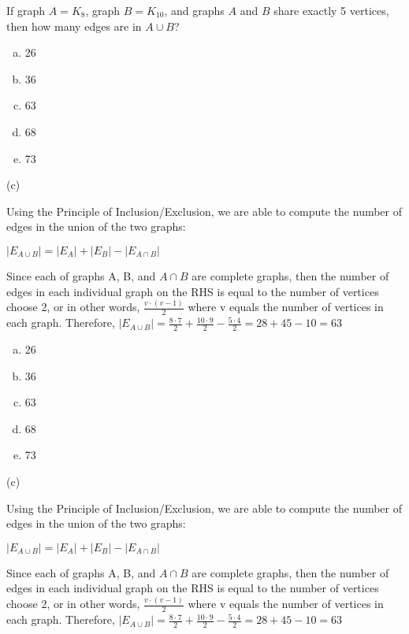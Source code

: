 If graph $A = K_8$, graph $B = K_{10}$, and graphs $A$ and $B$ share exactly 5 vertices, then how many edges are in $A \cup B$?

\begin{enumerate} [(a)]
    \item 26
    \item 36
    \item 63
    \item 68
    \item 73
\end{enumerate}

\begin{solution}
(c)

Using the Principle of Inclusion/Exclusion, we are able to compute the number of edges in the union of the two graphs:

$|E_{A \cup B}| = |E_A| + |E_B| - |E_{A \cap B}|$

Since each of graphs A, B, and $A \cap B$ are complete graphs, then the number of edges in each individual graph on the RHS is equal to the number of vertices choose 2, or in other words, $\frac{v \cdot (v - 1)}{2}$ where v equals the number of vertices in each graph. Therefore, $|E_{A \cup B}| = \frac{8 \cdot 7}{2} + \frac{10 \cdot 9}{2} - \frac{5 \cdot 4}{2} = 28 + 45 - 10 = 63$
\end{solution}

\newpage
\begin{enumerate}[(a)]
	\item  26
    
	\item  36
    
	\item  63
    
	\item  68
    
	\item  73

\end{enumerate}
\begin{solution}

(c)

Using the Principle of Inclusion/Exclusion, we are able to compute the number of edges in the union of the two graphs:

$|E_{A \cup B}| = |E_A| + |E_B| - |E_{A \cap B}|$

Since each of graphs A, B, and $A \cap B$ are complete graphs, then the number of edges in each individual graph on the RHS is equal to the number of vertices choose 2, or in other words, $\frac{v \cdot (v - 1)}{2}$ where v equals the number of vertices in each graph. Therefore, $|E_{A \cup B}| = \frac{8 \cdot 7}{2} + \frac{10 \cdot 9}{2} - \frac{5 \cdot 4}{2} = 28 + 45 - 10 = 63$

\end{solution}


